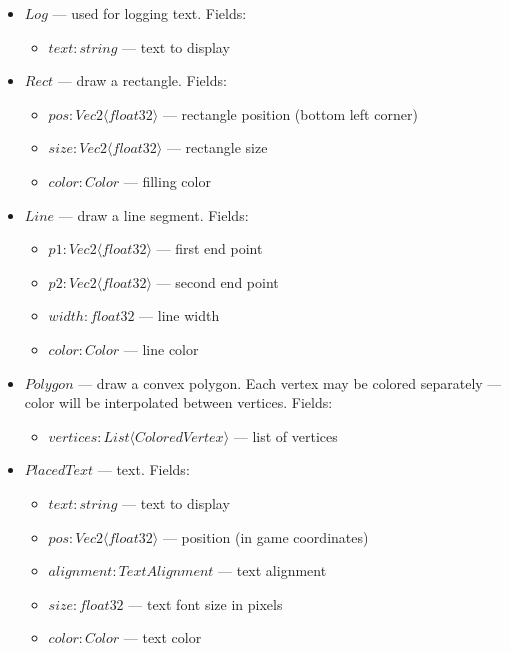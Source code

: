 \begin{itemize}
    \item $Log$ --- used for logging text. Fields:
        \begin{itemize}
            \item $text : string$ --- text to display
        \end{itemize}
    \item $Rect$ --- draw a rectangle. Fields:
        \begin{itemize}
            \item $pos : Vec2 \langle float32 \rangle$ --- rectangle position (bottom left corner)
            \item $size : Vec2 \langle float32 \rangle$ --- rectangle size
            \item $color : Color$ --- filling color
        \end{itemize}
    \item $Line$ --- draw a line segment. Fields:
        \begin{itemize}
            \item $p1 : Vec2 \langle float32 \rangle$ --- first end point
            \item $p2 : Vec2 \langle float32 \rangle$ --- second end point
            \item $width : float32$ --- line width
            \item $color : Color$ --- line color
        \end{itemize}
    \item $Polygon$ --- draw a convex polygon.
        Each vertex may be colored separately --- color will be interpolated between vertices. Fields:
        \begin{itemize}
            \item $vertices : List \langle ColoredVertex \rangle$ --- list of vertices
        \end{itemize}
    \item $PlacedText$ --- text. Fields:
        \begin{itemize}
            \item $text : string$ --- text to display
            \item $pos : Vec2 \langle float32 \rangle$ --- position (in game coordinates)
            \item $alignment : TextAlignment$ --- text alignment
            \item $size : float32$ --- text font size in pixels
            \item $color: Color$ --- text color
        \end{itemize}
\end{itemize}

